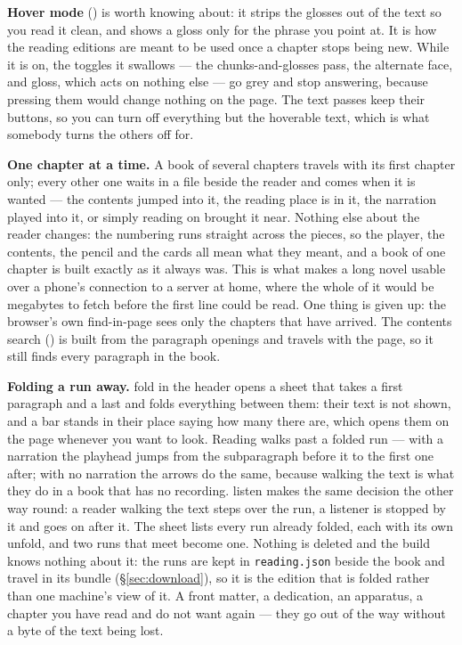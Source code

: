 \documentclass[11pt,oneside]{report}
\newcommand{\file}[1]{\texttt{#1}}
\newcommand{\key}[1]{\textsf{\small\fbox{#1}}}
\newcommand{\menu}[1]{\textsf{#1}}
\begin{document}
\textbf{Hover mode} (\key{H}) is worth knowing about: it strips the glosses
out of the text so you read it clean, and shows a gloss only for
the phrase you point at. It is how the reading editions are meant to be used
once a chapter stops being new. While it is on, the toggles it swallows ---
the chunks-and-glosses pass, the alternate face, and \menu{gloss}, which acts
on nothing else --- go grey and stop answering, because pressing them would
change nothing on the page. The text passes keep their buttons, so you can
turn off everything but the hoverable text, which is what somebody turns the
others off for.

\textbf{One chapter at a time.} A book of several chapters travels with its
first chapter only; every other one waits in a file beside the reader and
comes when it is wanted --- the contents jumped into it, the reading place is
in it, the narration played into it, or simply reading on brought it near.
Nothing else about the reader changes: the numbering runs straight across the
pieces, so the player, the contents, the pencil and the cards all mean what
they meant, and a book of one chapter is built exactly as it always was. This
is what makes a long novel usable over a phone's connection to a server at
home, where the whole of it would be megabytes to fetch before the first line
could be read. One thing is given up: the browser's own find-in-page sees
only the chapters that have arrived. The contents search (\key{C}) is built
from the paragraph openings and travels with the page, so it still finds
every paragraph in the book.

\textbf{Folding a run away.} \menu{fold} in the header opens a sheet that takes
a first paragraph and a last and folds everything between them: their text is
not shown, and a bar stands in their place saying how many there are, which
opens them on the page whenever you want to look. Reading walks past a folded
run --- with a narration the playhead jumps from the subparagraph before it to
the first one after; with no narration the arrows do the same, because walking
the text is what they do in a book that has no recording. \menu{listen} makes
the same decision the other way round: a reader walking the text steps over the
run, a listener is stopped by it and goes on after it. The sheet lists every
run already folded, each with its own \menu{unfold}, and two runs that meet
become one. Nothing is deleted and the build knows nothing about it: the runs
are kept in \file{reading.json} beside the book and travel in its bundle
(\S\ref{sec:download}), so it is the edition that is folded rather than one
machine's view of it. A front matter, a dedication, an apparatus, a chapter
you have read and do not want again --- they go out of the way without a byte
of the text being lost.
\end{document}
